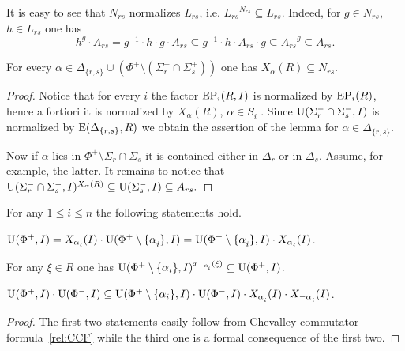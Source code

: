 It is easy to see that $N_{rs}$ normalizes $L_{rs}$, i.e. ${L_{rs}}^{N_{rs}} \subseteq L_{rs}$. 
Indeed, for $g\in N_{rs}$, $h\in L_{rs}$ one has
\begin{equation}\label{rel:NnormL} h^g \cdot A_{rs} = g^{-1} \cdot h \cdot g \cdot A_{rs} \subseteq g^{-1} \cdot h \cdot A_{rs} \cdot g \subseteq {A_{rs}}^g \subseteq A_{rs}.\end{equation}

\begin{lemma}\label{lemma:dv-normal} 
For every $\alpha \in \Delta_{\{r,s\}} \cup (\Phi^+ \setminus (\Sigma^+_r \cap \Sigma^+_s))$ one has $X_\alpha(R) \subseteq N_{rs}$. \end{lemma}
\begin{proof}
Notice that for every $i$ the factor $\operatorname{EP}_i(R, I)$ is normalized by $\operatorname{EP}_i(R)$, hence a fortiori it is normalized by $X_\alpha(R)$, $\alpha \in S_i^+$.
Since $\operatorname{U}(\Sigma_r^- \cap \Sigma_s^-, I)$ is normalized by $\operatorname{E}(\Delta_{\{r,s\}}, R)$ we obtain the assertion of the lemma for $\alpha \in \Delta_{\{r, s\}}$.

Now if $\alpha$ lies in $\Phi^+ \setminus \Sigma_r \cap \Sigma_s$ it is contained either in $\Delta_r$ or in $\Delta_s$.
Assume, for example, the latter. It remains to notice that $\operatorname{U}(\Sigma_r^- \cap \Sigma_s^-, I)^{X_\alpha(R)} \subseteq \operatorname{U}(\Sigma_s^-, I) \subseteq A_{rs}.$
\end{proof}

\begin{lemma}\label{lemma:dv_unipotent} For any $1\leq i\leq n$ the following statements hold. 
\begin{thmlist} \item \label{item-dvu1} $\U(\Phi^+, I) = X_{\alpha\ssub{i}}(I)\cdot \U(\Phi^+\setminus\{\alpha\ssub{i}\}, I) = \U(\Phi^+\setminus\{\alpha\ssub{i}\}, I)\cdot X_{\alpha\ssub{i}}(I)$.
\item \label{item-dvu2} For any $\xi\in R$ one has $\U(\Phi^+\setminus\{\alpha_i\}, I)^{x_{-\alpha\ssub{i}}(\xi)} \subseteq \U(\Phi^+, I)$.
\item \label{item-dvu3} $\U(\Phi^+, I)\cdot \U(\Phi^-, I) \subseteq \U(\Phi^+\setminus \{\alpha_i\}, I) \cdot \U(\Phi^-, I) \cdot X_{\alpha\ssub{i}}(I) \cdot X_{-\alpha\ssub{i}}(I)$.
\end{thmlist} \end{lemma}
\begin{proof} The first two statements easily follow from Chevalley commutator formula~\ref{rel:CCF} while the third one is a formal consequence of the first two. \end{proof}

